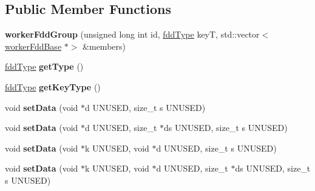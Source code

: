 \subsection*{Public Member Functions}
\begin{DoxyCompactItemize}
\item 
\hypertarget{classfaster_1_1workerFddGroup_ad925b72158482f9cdf8d84159fc4ed53}{}\label{classfaster_1_1workerFddGroup_ad925b72158482f9cdf8d84159fc4ed53} 
{\bfseries worker\+Fdd\+Group} (unsigned long int id, \hyperlink{namespacefaster_aa8898687bc64536b60a3d5f365060cd6}{fdd\+Type} keyT, std\+::vector$<$ \hyperlink{classfaster_1_1workerFddBase}{worker\+Fdd\+Base} $\ast$$>$ \&members)
\item 
\hypertarget{classfaster_1_1workerFddGroup_ae63a674f1aa32f94ad52c364923694b1}{}\label{classfaster_1_1workerFddGroup_ae63a674f1aa32f94ad52c364923694b1} 
\hyperlink{namespacefaster_aa8898687bc64536b60a3d5f365060cd6}{fdd\+Type} {\bfseries get\+Type} ()
\item 
\hypertarget{classfaster_1_1workerFddGroup_abc818de0a5d3dee42a947318171101e3}{}\label{classfaster_1_1workerFddGroup_abc818de0a5d3dee42a947318171101e3} 
\hyperlink{namespacefaster_aa8898687bc64536b60a3d5f365060cd6}{fdd\+Type} {\bfseries get\+Key\+Type} ()
\item 
\hypertarget{classfaster_1_1workerFddGroup_a6dbf3389af39d6a3bdf172a8cf38a476}{}\label{classfaster_1_1workerFddGroup_a6dbf3389af39d6a3bdf172a8cf38a476} 
void {\bfseries set\+Data} (void $\ast$d U\+N\+U\+S\+ED, size\+\_\+t s U\+N\+U\+S\+ED)
\item 
\hypertarget{classfaster_1_1workerFddGroup_ab2e537d9dd20658236084d1d97ded324}{}\label{classfaster_1_1workerFddGroup_ab2e537d9dd20658236084d1d97ded324} 
void {\bfseries set\+Data} (void $\ast$d U\+N\+U\+S\+ED, size\+\_\+t $\ast$ds U\+N\+U\+S\+ED, size\+\_\+t s U\+N\+U\+S\+ED)
\item 
\hypertarget{classfaster_1_1workerFddGroup_a40b698ad7823ceb2ffab2fd7dca1f7bd}{}\label{classfaster_1_1workerFddGroup_a40b698ad7823ceb2ffab2fd7dca1f7bd} 
void {\bfseries set\+Data} (void $\ast$k U\+N\+U\+S\+ED, void $\ast$d U\+N\+U\+S\+ED, size\+\_\+t s U\+N\+U\+S\+ED)
\item 
\hypertarget{classfaster_1_1workerFddGroup_abadd56f253ffbdaf46b38f6e3c2e708a}{}\label{classfaster_1_1workerFddGroup_abadd56f253ffbdaf46b38f6e3c2e708a} 
void {\bfseries set\+Data} (void $\ast$k U\+N\+U\+S\+ED, void $\ast$d U\+N\+U\+S\+ED, size\+\_\+t $\ast$ds U\+N\+U\+S\+ED, size\+\_\+t s U\+N\+U\+S\+ED)
\item 
$$
\end{DoxyCompactItemize}
